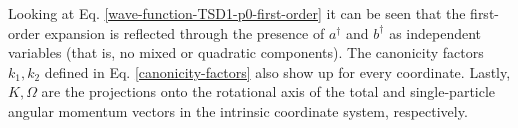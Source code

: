 Looking at Eq. \ref{wave-function-TSD1-p0-first-order} it can be seen that the first-order expansion is reflected through the presence of $a^\dagger$ and $b^\dagger$ as independent variables (that is, no mixed or quadratic components). The canonicity factors $k_1,k_2$ defined in Eq. \ref{canonicity-factors} also show up for every coordinate. Lastly, $K,\Omega$ are the projections onto the rotational axis of the total and single-particle angular momentum vectors in the intrinsic coordinate system, respectively. 

